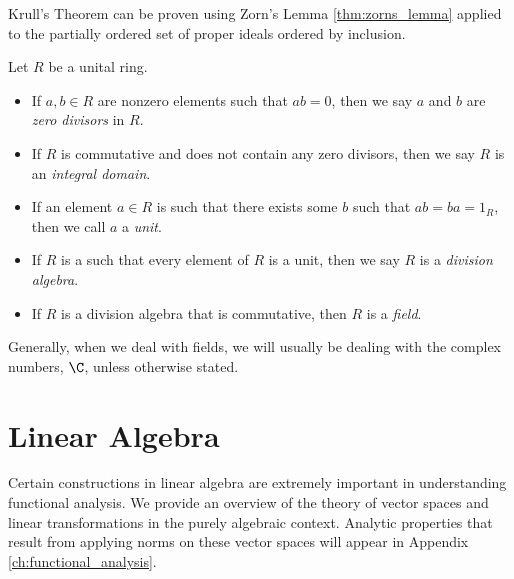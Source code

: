 \begin{remark}
  Krull's Theorem can be proven using Zorn's Lemma \ref{thm:zorns_lemma} applied to the partially ordered set of proper ideals ordered by inclusion.
\end{remark}
\begin{definition}
  Let $R$ be a unital ring.
  \begin{itemize}
    \item If $a,b\in R$ are nonzero elements such that $ab = 0$, then we say $a$ and $b$ are \textit{zero divisors} in $R$.
    \item If $R$ is commutative and does not contain any zero divisors, then we say $R$ is an \textit{integral domain}.
    \item If an element $a\in R$ is such that there exists some $b$ such that $ab = ba = 1_R$, then we call $a$ a \textit{unit}.
    \item If $R$ is a such that every element of $R$ is a unit, then we say $R$ is a \textit{division algebra}.
    \item If $R$ is a division algebra that is commutative, then $R$ is a \textit{field}.
  \end{itemize}
\end{definition}
\begin{remark}
  Generally, when we deal with fields, we will usually be dealing with the complex numbers, $\C$, unless otherwise stated.
\end{remark}
\section{Linear Algebra}%
Certain constructions in linear algebra are extremely important in understanding functional analysis. We provide an overview of the theory of vector spaces and linear transformations in the purely algebraic context. Analytic properties that result from applying norms on these vector spaces will appear in Appendix \ref{ch:functional_analysis}.

